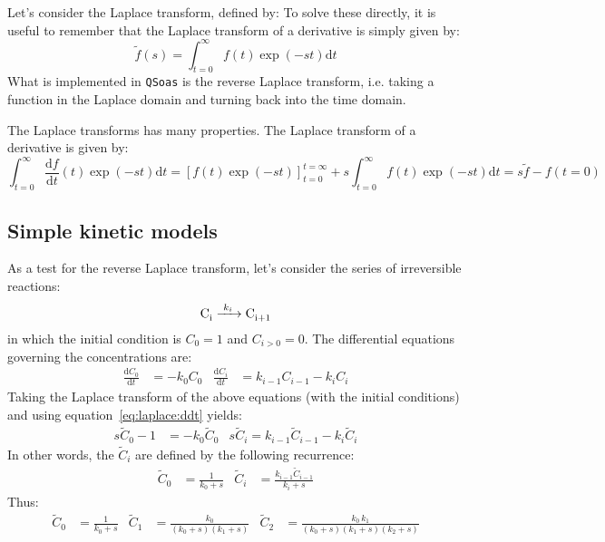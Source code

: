 \documentclass{article}
\newcommand{\dd}{\mathrm{d}}
\newcommand{\ddt}[1]{\frac{\dd #1}{\dd t}}
\newcommand{\pa}[1]{\left(#1\right)}
\newcommand{\QSoas}{\texttt{QSoas}}
\begin{document}
Let's consider the Laplace transform, defined by:
To solve these directly, it is useful to remember that the Laplace
transform of a derivative is simply given by:
%
\begin{equation}
  \tilde{f}(s) = \int_{t = 0}^{\infty} f(t) \exp \pa{-st} \dd t
  \label{eq:laplace:def}
\end{equation}
%
What is implemented in \QSoas{} is the reverse Laplace transform,
i.e. taking a function in the Laplace domain and turning back into the
time domain.

The Laplace transforms has many properties.
The Laplace transform of a derivative is given by:
%
\begin{equation}
  \int_{t = 0}^{\infty} \ddt{f}(t) \exp \pa{-st} \dd t
  = [f(t)\exp\pa{-st}]_{t = 0}^{t = \infty}
  + s \int_{t = 0}^{\infty} f(t) \exp \pa{-st}\dd t
  = s\tilde{f} - f(t = 0)
  \label{eq:laplace:ddt}
\end{equation}



\subsection{Simple kinetic models}

As a test for the reverse Laplace transform, let's consider the series
of irreversible reactions:
%
\begin{equation}
  \ce{C_{i} ->[k_i] C_{i+1}}
\end{equation}
%
in which the initial condition is $C_0 = 1$ and $C_{i>0} = 0$. The
differential equations governing the concentrations are:
%
\begin{align}
  \ddt{C_0} &= -k_0 C_0 &
  \ddt{C_i} &= k_{i-1} C_{i-1} - k_{i} C_{i} 
\end{align}
%
Taking the Laplace transform of the above equations (with the initial
conditions) and using equation~\eqref{eq:laplace:ddt} yields:
%
\begin{align}
  s \tilde{C}_0 - 1 &= -k_0 \tilde{C}_0 &
  s \tilde{C}_i = k_{i-1} \tilde{C}_{i-1} - k_{i} \tilde{C}_{i} 
\end{align}
%
In other words, the $\tilde{C}_i$ are defined by the following
recurrence:
%
\begin{align}
  \tilde{C}_0 &= \frac{1}{k_0 + s} &
  \tilde{C}_i &= \frac{k_{i-1} \tilde{C}_{i-1}}{k_i + s}
\end{align}
%
Thus:
\begin{align}
  \tilde{C}_0 &= \frac{1}{k_0 + s} & 
  \tilde{C}_1 &= \frac{k_{0}}{\pa{k_0 + s}\pa{k_1 + s}} &
  \tilde{C}_2 &= \frac{k_{0}\,k_1}{\pa{k_0 + s}\pa{k_1 + s}\pa{k_2 + s}}
\end{align}
\end{document}
